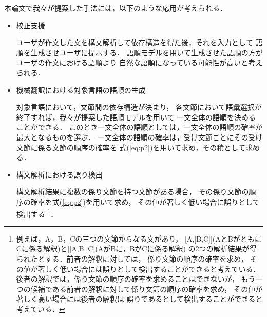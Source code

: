 本論文で我々が提案した手法には，以下のような応用が考えられる．
\begin{itemize}
\item 校正支援

  ユーザが作文した文を構文解析して依存構造を得た後，それを入力として
  語順を生成させユーザに提示する．
  語順モデルを用いて生成させた語順の方がユーザの作文における語順より
  自然な語順になっている可能性が高いと考えられる．

\item 機械翻訳における対象言語の語順の生成

  対象言語において，文節間の依存構造が決まり，
  各文節において語彙選択が終了すれば，我々が提案した語順モデルを用いて
  一文全体の語順を決めることができる．
  このとき一文全体の語順としては，一文全体の語順の確率が最大となるものを選ぶ．
  一文全体の語順の確率は，受け文節ごとにその受け文節に係る文節の順序の確率を
  式(\ref{eq:p2})を用いて求め，その積として求める．

\item 構文解析における誤り検出

  構文解析結果に複数の係り文節を持つ文節がある場合，
  その係り文節の順序の確率を式(\ref{eq:p2})を用いて求め，
  その値が著しく低い場合に誤りとして検出する
  \footnote{例えば，A，B，Cの三つの文節からなる文があり，
    [A,[B,C]](AとBがともにCに係る解釈)と[[A,B],C](AがBに，BがCに係る解釈)
    の2つの解析結果が得られたとする．前者の解釈に対しては，
    係り文節の順序の確率を求め，
    その値が著しく低い場合には誤りとして検出することができると考えている．
    後者の解釈では，係り文節の順序の確率を求めることはできないが，
    もう一つの候補である前者の解釈に対して係り文節の順序の確率を求め，
    その値が著しく高い場合には後者の解釈は
    誤りであるとして検出することができると考えている．
    }．

\end{itemize}







